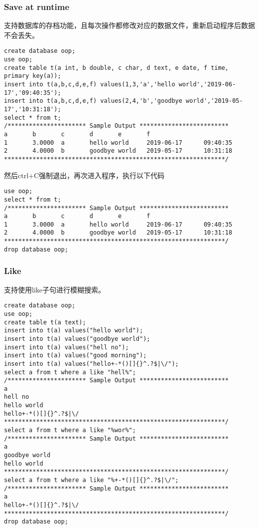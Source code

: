 \documentclass[12pt,a4paper]{article}
\begin{document}
\subsubsection{Save at runtime}

支持数据库的存档功能，且每次操作都修改对应的数据文件，重新启动程序后数据不会丢失。

\begin{lstlisting}
create database oop;
use oop;
create table t(a int, b double, c char, d text, e date, f time, primary key(a)); 
insert into t(a,b,c,d,e,f) values(1,3,'a','hello world','2019-06-17','09:40:35'); 
insert into t(a,b,c,d,e,f) values(2,4,'b','goodbye world','2019-05-17','10:31:18'); 
select * from t; 
/********************** Sample Output *************************
a       b       c       d       e       f       
1       3.0000  a       hello world     2019-06-17      09:40:35   
2       4.0000  b       goodbye world   2019-05-17      10:31:18   
**************************************************************/
\end{lstlisting}

然后ctrl+C强制退出，再次进入程序，执行以下代码

\begin{lstlisting}
use oop; 
select * from t; 
/********************** Sample Output *************************
a       b       c       d       e       f       
1       3.0000  a       hello world     2019-06-17      09:40:35 
2       4.0000  b       goodbye world   2019-05-17      10:31:18
**************************************************************/
drop database oop;
\end{lstlisting}

\subsubsection{Like}
\label{sec:like}

支持使用like子句进行模糊搜索。

\begin{lstlisting}
create database oop;
use oop;
create table t(a text); 
insert into t(a) values("hello world"); 
insert into t(a) values("goodbye world");
insert into t(a) values("hell no");
insert into t(a) values("good morning");
insert into t(a) values("hello+-*()[]{}^.?$|\/"); 
select a from t where a like "hell%"; 
/********************** Sample Output *************************
a       
hell no 
hello world     
hello+-*()[]{}^.?$|\/   
**************************************************************/
select a from t where a like "%wor%";
/********************** Sample Output *************************
a       
goodbye world   
hello world 
**************************************************************/
select a from t where a like "%+-*()[]{}^.?$|\/";
/********************** Sample Output *************************
a       
hello+-*()[]{}^.?$|\/   
**************************************************************/
drop database oop;
\end{lstlisting}
\end{document}
